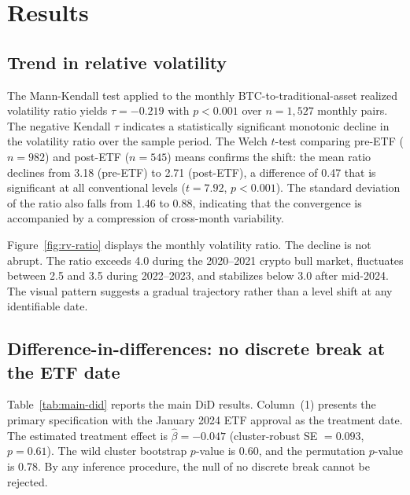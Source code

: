 \documentclass[12pt,a4paper]{article}
\begin{document}
\FloatBarrier

\section{Results}\label{sec:results}

\subsection{Trend in relative volatility}\label{sec:res-trend}

The Mann-Kendall test applied to the monthly BTC-to-traditional-asset
realized volatility ratio yields $\tau = -0.219$ with $p < 0.001$ over
$n = 1{,}527$ monthly pairs. The negative Kendall $\tau$ indicates a
statistically significant monotonic decline in the volatility ratio over
the sample period. The Welch $t$-test comparing pre-ETF ($n = 982$) and
post-ETF ($n = 545$) means confirms the shift: the mean ratio declines
from 3.18 (pre-ETF) to 2.71 (post-ETF), a difference of 0.47 that is
significant at all conventional levels ($t = 7.92$, $p < 0.001$). The
standard deviation of the ratio also falls from 1.46 to 0.88, indicating
that the convergence is accompanied by a compression of cross-month
variability.

Figure~\ref{fig:rv-ratio} displays the monthly volatility ratio. The
decline is not abrupt. The ratio exceeds 4.0 during the 2020--2021 crypto
bull market, fluctuates between 2.5 and 3.5 during 2022--2023, and
stabilizes below 3.0 after mid-2024. The visual pattern suggests a gradual
trajectory rather than a level shift at any identifiable date.

\FloatBarrier

\subsection{Difference-in-differences: no discrete break at the ETF date}\label{sec:res-did}

Table~\ref{tab:main-did} reports the main DiD results. Column~(1) presents
the primary specification with the January 2024 ETF approval as the
treatment date. The estimated treatment effect is $\hat{\beta} = -0.047$
(cluster-robust SE $= 0.093$, $p = 0.61$). The wild cluster bootstrap
$p$-value is 0.60, and the permutation $p$-value is 0.78. By any inference
procedure, the null of no discrete break cannot be rejected.
\end{document}
